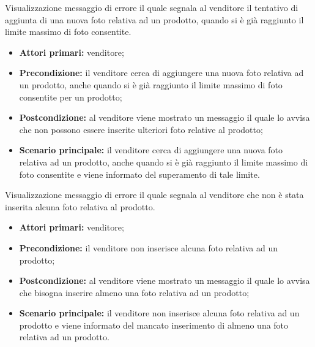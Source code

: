 Visualizzazione messaggio di errore il quale segnala al venditore il tentativo di aggiunta di una nuova foto relativa ad un prodotto, quando si è già raggiunto il limite massimo di foto consentite.
\begin{itemize}
    \item \textbf{Attori primari:} venditore;
    \item \textbf{Precondizione:} il venditore cerca di aggiungere una nuova foto relativa ad un prodotto, anche quando si è già raggiunto il limite massimo di foto consentite per un prodotto;
    \item \textbf{Postcondizione:} al venditore viene mostrato un messaggio il quale lo avvisa che non possono essere inserite ulteriori foto relative al prodotto;
    \item \textbf{Scenario principale:} il venditore cerca di aggiungere una nuova foto relativa ad un prodotto, anche quando si è già raggiunto il limite massimo di foto consentite e viene informato del superamento di tale limite.
\end{itemize}


Visualizzazione messaggio di errore il quale segnala al venditore che non è stata inserita alcuna foto relativa al prodotto.
\begin{itemize}
    \item \textbf{Attori primari:} venditore;
    \item \textbf{Precondizione:} il venditore non inserisce alcuna foto relativa ad un prodotto;
    \item \textbf{Postcondizione:} al venditore viene mostrato un messaggio il quale lo avvisa che bisogna inserire almeno una foto relativa ad un prodotto;
    \item \textbf{Scenario principale:} il venditore non inserisce alcuna foto relativa ad un prodotto e viene informato del mancato inserimento di almeno una foto relativa ad un prodotto.
\end{itemize}



